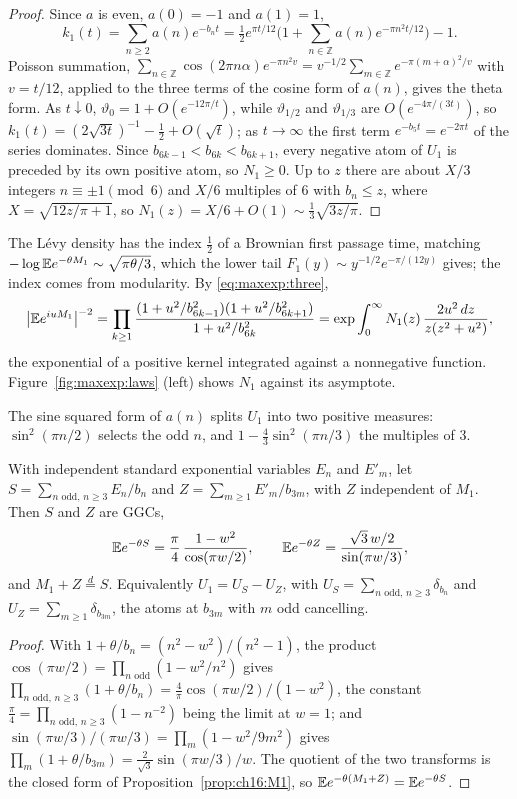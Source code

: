 \begin{proof}
Since $a$ is even, $a(0)=-1$ and $a(1)=1$,
\[
k_1(t)=\sum_{n\ge2}a(n)e^{-b_nt}=\tfrac12e^{\pi t/12}\Big(1+\sum_{n\in\mathbb Z}a(n)e^{-\pi n^2t/12}\Big)-1.
\]
Poisson summation, $\sum_{n\in\mathbb Z}\cos(2\pi n\alpha)e^{-\pi n^2v}=v^{-1/2}\sum_{m\in\mathbb Z}e^{-\pi(m+\alpha)^2/v}$ with $v=t/12$, applied to the three terms of the cosine form of $a(n)$, gives the theta form. As $t\downarrow0$, $\vartheta_0=1+O(e^{-12\pi/t})$, while $\vartheta_{1/2}$ and $\vartheta_{1/3}$ are $O(e^{-4\pi/(3t)})$, so $k_1(t)=(2\sqrt{3t})^{-1}-\frac12+O(\sqrt t)$; as $t\to\infty$ the first term $e^{-b_5t}=e^{-2\pi t}$ of the series dominates. Since $b_{6k-1}<b_{6k}<b_{6k+1}$, every negative atom of $U_1$ is preceded by its own positive atom, so $N_1\ge0$. Up to $z$ there are about $X/3$ integers $n\equiv\pm1\pmod6$ and $X/6$ multiples of $6$ with $b_n\le z$, where $X=\sqrt{12z/\pi+1}$, so $N_1(z)=X/6+O(1)\sim\frac13\sqrt{3z/\pi}$.
\end{proof}

The L\'evy density has the index $\frac12$ of a Brownian first passage time, matching $-\log\mathbb{E} e^{-\theta M_1}\sim\sqrt{\pi\theta/3}$, which the lower tail $F_1(y)\sim y^{-1/2}e^{-\pi/(12y)}$ gives; the index comes from modularity. By \eqref{eq:maxexp:three},
\[
\big|\mathbb{E} e^{iuM_1}\big|^{-2}=\prod_{k\ge1}\frac{(1+u^2/b_{6k-1}^2)(1+u^2/b_{6k+1}^2)}{1+u^2/b_{6k}^2}=\exp\int_0^\infty N_1(z)\,\frac{2u^2\,dz}{z(z^2+u^2)},
\]
the exponential of a positive kernel integrated against a nonnegative function. Figure~\ref{fig:maxexp:laws} (left) shows $N_1$ against its asymptote.

The sine squared form of $a(n)$ splits $U_1$ into two positive measures: $\sin^2(\pi n/2)$ selects the odd $n$, and $1-\frac43\sin^2(\pi n/3)$ the multiples of $3$.

\begin{theorem}\label{thm:maxexp:ggc}
With independent standard exponential variables $E_n$ and $E'_m$, let $S=\sum_{n\text{ odd},\,n\ge3}E_n/b_n$ and $Z=\sum_{m\ge1}E'_m/b_{3m}$, with $Z$ independent of $M_1$. Then $S$ and $Z$ are GGCs,
\[
\mathbb{E} e^{-\theta S}=\frac\pi4\,\frac{1-w^2}{\cos(\pi w/2)},\qquad \mathbb{E} e^{-\theta Z}=\frac{\sqrt3\,w/2}{\sin(\pi w/3)},
\]
and $M_1+Z\overset d=S$. Equivalently $U_1=U_S-U_Z$, with $U_S=\sum_{n\text{ odd},\,n\ge3}\delta_{b_n}$ and $U_Z=\sum_{m\ge1}\delta_{b_{3m}}$, the atoms at $b_{3m}$ with $m$ odd cancelling.
\end{theorem}

\begin{proof}
With $1+\theta/b_n=(n^2-w^2)/(n^2-1)$, the product $\cos(\pi w/2)=\prod_{n\text{ odd}}(1-w^2/n^2)$ gives $\prod_{n\text{ odd},\,n\ge3}(1+\theta/b_n)=\frac4\pi\cos(\pi w/2)/(1-w^2)$, the constant $\frac\pi4=\prod_{n\text{ odd},\,n\ge3}(1-n^{-2})$ being the limit at $w=1$; and $\sin(\pi w/3)/(\pi w/3)=\prod_m(1-w^2/9m^2)$ gives $\prod_m(1+\theta/b_{3m})=\frac2{\sqrt3}\sin(\pi w/3)/w$. The quotient of the two transforms is the closed form of Proposition~\ref{prop:ch16:M1}, so $\mathbb{E} e^{-\theta(M_1+Z)}=\mathbb{E} e^{-\theta S}$.
\end{proof}

